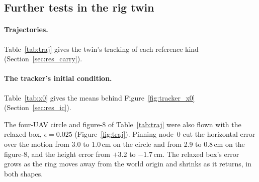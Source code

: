 \subsection{Further tests in the rig twin}
\label{sec:app_tests}

\paragraph{Trajectories.} Table~\ref{tab:traj} gives the twin's tracking of each reference kind
(Section~\ref{sec:res_carry}).
\begin{table}[htbp]
\centering
\caption[Trajectory tracking]{Trajectory tracking in the Gazebo rig twin, $\epsilon = 0$, no integral
action, ring at 1.0\,m, floor start. Four UAVs fly the even ring except in the four-UAV hover, which
uses the detach layout. Speed: the commanded speed, which the line and the spin reach at their
peak. Horizontal error per sample, sampled where the planner's reference updates, over the motion
(the circle's first lap) or the 15\,s before LAND (hover); height error and tilt: means over the
same window; each cell is the mean over the runs.}
\label{tab:traj}

\end{table}


\paragraph{The tracker's initial condition.} Table~\ref{tab:x0} gives the means behind
Figure~\ref{fig:tracker_x0} (Section~\ref{sec:res_ic}).
\begin{table}[h]
\centering
\caption{Ring error with the relaxed and the pinned initial condition, no integral action. The
circle with $\epsilon = 0.025$ is a single run on an earlier code version; its horizontal error
reproduces on the current code (2.8\,cm, with the height integral on).}
\label{tab:x0}

\end{table}

The four-UAV circle and figure-8 of Table~\ref{tab:traj} were also flown with the relaxed box,
$\epsilon = 0.025$ (Figure~\ref{fig:traj}). Pinning node~0 cut the
horizontal error over the motion from 3.0 to 1.0\,cm on the circle and from 2.9 to 0.8\,cm on the
figure-8, and the height error from $+3.2$ to $-1.7$\,cm. The relaxed box's error grows as the ring
moves away from the world origin and shrinks as it returns, in both shapes.

